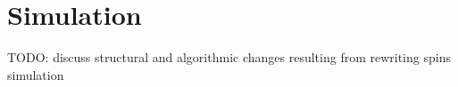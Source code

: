 \chapter{Simulation}
TODO: discuss structural and algorithmic changes resulting from rewriting spins simulation
